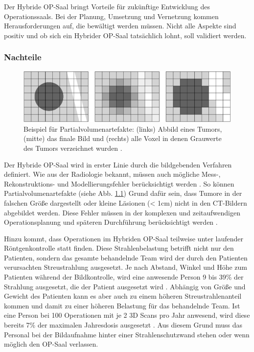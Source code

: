 \chapter{}
\label{sec:overview}

Der Hybride OP-Saal bringt Vorteile für zukünftige Entwicklung des Operationssaals. Bei der Planung, Umsetzung und Vernetzung kommen Herausforderungen auf, die bewältigt werden müssen. Nicht alle Aspekte sind positiv und ob sich ein Hybrider OP-Saal tatsächlich lohnt, soll validiert werden.

\subsection{Nachteile}

\begin{figure} [H]
	\includegraphics[scale = 0.7]{Content/Pictures/partial.png}
	\caption{Beispiel für Partialvolumenartefakte: (links) Abbild eines Tumors, (mitte) das finale Bild und (rechts) alle Voxel in denen Grauwerte des Tumors verzeichnet wurden \cite{DerDigitaleOperationssaal}.}
	\label{fig:partial}
\end{figure}

Der Hybride OP-Saal wird in erster Linie durch die bildgebenden Verfahren definiert. Wie aus der Radiologie bekannt, müssen auch mögliche \glqq Mess-, Rekonstruktions- und Modellierungsfehler berücksichtigt werden\grqq{} \cite{DerDigitaleOperationssaal}. So können Partialvolumenartefakte (siehe Abb. \ref{fig:partial}) Grund dafür sein, dass Tumore in der falschen Größe dargestellt oder kleine Läsionen (< 1cm) nicht in den CT-Bildern abgebildet werden. Diese Fehler müssen in der komplexen und zeitaufwendigen Operationsplanung und späteren Durchführung berücksichtigt werden \cite{DerDigitaleOperationssaal}.

Hinzu kommt, dass Operationen im Hybriden OP-Saal teilweise unter laufender Röntgenkontrolle statt finden. Diese Strahlenbelastung betrifft nicht nur den Patienten, sondern das gesamte behandelnde Team wird der durch den Patienten verursachten Streustrahlung ausgesetzt. Je nach Abstand, Winkel und Höhe zum Patienten während der Bildkontrolle, wird eine anwesende Person 9 bis 39\% der Strahlung ausgesetzt, die der Patient ausgesetzt wird \cite{RadiationExposure}. Abhängig von Größe und Gewicht des Patienten kann es aber auch zu einem höheren Streustrahlenanteil kommen und damit zu einer höheren Belastung für das behandelnde Team. Ist eine Person bei 100 Operationen mit je 2 3D Scans pro Jahr anwesend, wird diese bereits 7\% der maximalen Jahresdosis ausgesetzt \cite{RadiationExposure}. Aus diesem Grund muss das Personal bei der Bildaufnahme hinter einer Strahlenschutzwand stehen oder wenn möglich den OP-Saal verlassen.

